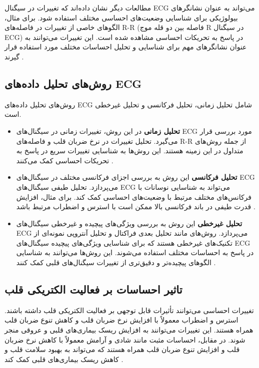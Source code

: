 \documentclass[12pt]{article}
\begin{document}
مطالعات دیگر نشان داده‌اند که تغییرات در سیگنال ECG می‌تواند به عنوان نشانگرهای بیولوژیکی برای شناسایی وضعیت‌های احساسی مختلف استفاده شود. برای مثال، الگوهای خاصی از تغییرات در فاصله‌های R-R (فاصله بین دو قله موج R در سیگنال ECG) در پاسخ به تحریکات احساسی مشاهده شده است. این تغییرات می‌توانند به عنوان نشانگرهای مهم برای شناسایی و تحلیل احساسات مختلف مورد استفاده قرار گیرند \cite{He2020}.

\subsection{روش‌های تحلیل داده‌های ECG}

روش‌های تحلیل داده‌های ECG شامل تحلیل زمانی، تحلیل فرکانسی و تحلیل غیرخطی است.
\begin{itemize}

\item \textbf{تحلیل زمانی}  در این روش، تغییرات زمانی در سیگنال‌های ECG مورد بررسی قرار می‌گیرد. تحلیل تغییرات در نرخ ضربان قلب و فاصله‌های R-R از جمله روش‌های متداول در این زمینه هستند. این روش‌ها به شناسایی تغییرات سریع در پاسخ به تحریکات احساسی کمک می‌کنند \cite{Dzedzickis2020}.

\item \textbf{تحلیل فرکانسی}  این روش به بررسی اجزای فرکانسی مختلف در سیگنال‌های ECG می‌پردازد. تحلیل طیفی سیگنال‌های ECG می‌تواند به شناسایی نوسانات با فرکانس‌های مختلف مرتبط با وضعیت‌های احساسی کمک کند. برای مثال، افزایش قدرت طیفی در باند فرکانسی بالا ممکن است با استرس و اضطراب مرتبط باشد \cite{Nweke2019}.

\item \textbf{تحلیل غیرخطی}  این روش به بررسی ویژگی‌های پیچیده و غیرخطی سیگنال‌های ECG می‌پردازد. روش‌های مانند تحلیل بعدی فراکتال و تحلیل آنتروپی نمونه‌ای از تکنیک‌های غیرخطی هستند که برای شناسایی ویژگی‌های پیچیده سیگنال‌های ECG در پاسخ به احساسات مختلف استفاده می‌شوند. این روش‌ها می‌توانند به شناسایی الگوهای پیچیده‌تر و دقیق‌تری از تغییرات سیگنال‌های قلبی کمک کنند \cite{Liu2018}.
\end{itemize}

\subsection{تاثیر احساسات بر فعالیت الکتریکی قلب}

تغییرات احساسی می‌توانند تأثیرات قابل توجهی بر فعالیت الکتریکی قلب داشته باشند. استرس و اضطراب معمولاً با افزایش نرخ ضربان قلب و کاهش تنوع ضربان قلب همراه هستند. این تغییرات می‌توانند به افزایش ریسک بیماری‌های قلبی و عروقی منجر شوند. در مقابل، احساسات مثبت مانند شادی و آرامش معمولاً با کاهش نرخ ضربان قلب و افزایش تنوع ضربان قلب همراه هستند که می‌تواند به بهبود سلامت قلب و کاهش ریسک بیماری‌های قلبی کمک کند \cite{Zhao2021}.
\end{document}
